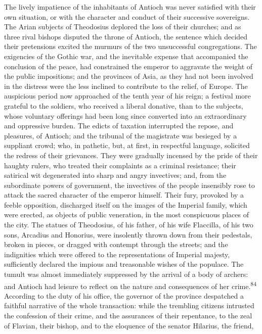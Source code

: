 The lively impatience of the inhabitants of Antioch was never
satisfied with their own situation, or with the character and
conduct of their successive sovereigns. The Arian subjects of
Theodosius deplored the loss of their churches; and as three
rival bishops disputed the throne of Antioch, the sentence which
decided their pretensions excited the murmurs of the two
unsuccessful congregations. The exigencies of the Gothic war, and
the inevitable expense that accompanied the conclusion of the
peace, had constrained the emperor to aggravate the weight of the
public impositions; and the provinces of Asia, as they had not
been involved in the distress were the less inclined to
contribute to the relief, of Europe. The auspicious period now
approached of the tenth year of his reign; a festival more
grateful to the soldiers, who received a liberal donative, than
to the subjects, whose voluntary offerings had been long since
converted into an extraordinary and oppressive burden. The edicts
of taxation interrupted the repose, and pleasures, of Antioch;
and the tribunal of the magistrate was besieged by a suppliant
crowd; who, in pathetic, but, at first, in respectful language,
solicited the redress of their grievances. They were gradually
incensed by the pride of their haughty rulers, who treated their
complaints as a criminal resistance; their satirical wit
degenerated into sharp and angry invectives; and, from the
subordinate powers of government, the invectives of the people
insensibly rose to attack the sacred character of the emperor
himself. Their fury, provoked by a feeble opposition, discharged
itself on the images of the Imperial family, which were erected,
as objects of public veneration, in the most conspicuous places
of the city. The statues of Theodosius, of his father, of his
wife Flaccilla, of his two sons, Arcadius and Honorius, were
insolently thrown down from their pedestals, broken in pieces, or
dragged with contempt through the streets; and the indignities
which were offered to the representations of Imperial majesty,
sufficiently declared the impious and treasonable wishes of the
populace. The tumult was almost immediately suppressed by the
arrival of a body of archers: and Antioch had leisure to reflect
on the nature and consequences of her crime.\textsuperscript{84} According to the
duty of his office, the governor of the province despatched a
faithful narrative of the whole transaction: while the trembling
citizens intrusted the confession of their crime, and the
assurances of their repentance, to the zeal of Flavian, their
bishop, and to the eloquence of the senator Hilarius, the friend,
